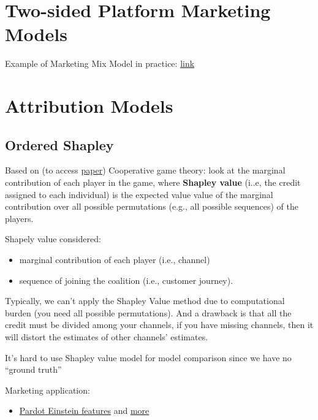 \documentclass[
]{book}
\providecommand{\tightlist}{%
  \setlength{\itemsep}{0pt}\setlength{\parskip}{0pt}}
\begin{document}
\hypertarget{two-sided-platform-marketing-models}{%
\section{Two-sided Platform Marketing Models}\label{two-sided-platform-marketing-models}}

Example of Marketing Mix Model in practice:
\href{http://datafeedtoolbox.com/marketing-mix-model-for-all-using-r-for-mmm/}{link}

\hypertarget{attribution-models}{%
\section{Attribution Models}\label{attribution-models}}

\hypertarget{ordered-shapley}{%
\subsection{Ordered Shapley}\label{ordered-shapley}}

Based on \citep{Zhao_2018} (to access \href{https://arxiv.org/ftp/arxiv/papers/1804/1804.05327.pdf}{paper}) Cooperative game
theory: look at the marginal contribution of each player in the game, where \textbf{Shapley value} (i..e, the credit assigned
to each individual) is the expected value value of the marginal contribution over all possible permutations (e.g., all
possible sequences) of the players.

Shapely value considered:

\begin{itemize}
\tightlist
\item
  marginal contribution of each player (i.e., channel)
\item
  sequence of joining the coalition (i.e., customer journey).
\end{itemize}

Typically, we can't apply the Shapley Value method due to computational burden (you need all possible permutations). And
a drawback is that all the credit must be divided among your channels, if you have missing channels, then it will
distort the estimates of other channels' estimates.

It's hard to use Shapley value model for model comparison since we have no ``ground truth''

Marketing application:

\begin{itemize}
\tightlist
\item
  \href{\%5Bhttps://salesforceben.com/the-drip/complete-overview-of-pardot-einstein-features\%5D(https://salesforceben.com/the-drip/complete-overview-of-pardot-einstein-features/)}{Pardot Einstein
  features}
  and \href{https://www.salesforceben.com/the-drip/pardot-einstein-attribution-a-deeper-dive/}{more}
\end{itemize}
\end{document}

